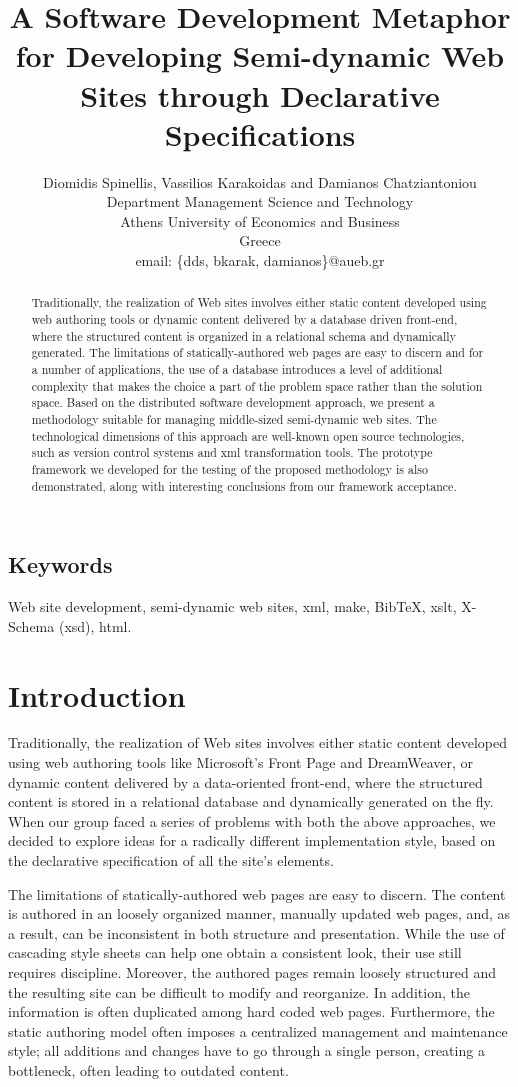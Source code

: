 \documentclass[10pt]{article}
\title{A Software Development Metaphor for Developing Semi-dynamic Web Sites through Declarative Specifications}
\author{Diomidis Spinellis, Vassilios Karakoidas and Damianos Chatziantoniou\\
Department Management Science and Technology\\
Athens University of Economics and Business\\
Greece\\
email: \{dds, bkarak, damianos\}@aueb.gr}
\date{}
\begin{document}
\maketitle

\begin{abstract}
\noindent
Traditionally, the realization of Web sites involves either
static content developed using web authoring tools or dynamic
content delivered by a database driven front-end,
where the structured content is organized
in a relational schema and dynamically generated.
The limitations of statically-authored web pages are easy to discern and
for a number of applications, the use of a database
introduces a level of additional complexity that
makes the choice a part of the problem space rather than the solution space.
Based on the distributed software development approach, we present a methodology suitable for managing 
middle-sized semi-dynamic web sites. The technological dimensions of this
approach are well-known open source technologies, such as version control systems
and {\sc xml} transformation tools. The prototype framework we developed for the testing of the proposed methodology
is also demonstrated, along with interesting conclusions from our framework acceptance.
\end{abstract}

\subsection*{Keywords}
Web site development, semi-dynamic web sites, {\sc xml}, make, {\sc BibTeX}, {\sc xslt}, {\sc X-Schema (xsd)}, {\sc html}.

\section{Introduction}
\label{sec:intro}
Traditionally, the realization of Web sites involves either
static content developed using web authoring tools like
Microsoft's Front Page and DreamWeaver, or dynamic
content delivered by a data-oriented front-end,
where the structured content is stored in a relational database 
and dynamically generated on the fly.
When our group faced a series of problems with both the above approaches,
we decided to explore ideas for a radically different
implementation style, based on the declarative specification
of all the site's elements.

The limitations of statically-authored web pages are easy to discern.
The content is authored in an loosely organized manner, manually updated web pages, and, as a result,
can be inconsistent in both structure and presentation.
While the use of cascading style sheets can help one obtain a
consistent look, their use still requires discipline.
Moreover, the authored pages remain loosely structured and the resulting
site can be difficult to modify and reorganize. In addition, the information is often duplicated
among hard coded web pages.
Furthermore, the static authoring model often imposes a centralized
management and maintenance style;
all additions and changes have to go through a single person,
creating a bottleneck, often leading to outdated content.
\end{document}
